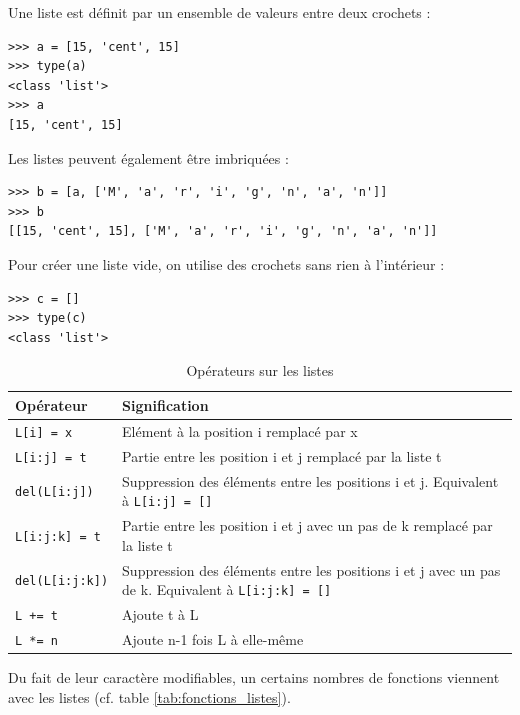 \documentclass[12pt, a4paper]{article}
\begin{document}
Une liste est définit par un ensemble de valeurs entre deux crochets :
\begin{lstlisting}
>>> a = [15, 'cent', 15]
>>> type(a)
<class 'list'>
>>> a
[15, 'cent', 15]
\end{lstlisting}

Les listes peuvent également être imbriquées :
\begin{lstlisting}
>>> b = [a, ['M', 'a', 'r', 'i', 'g', 'n', 'a', 'n']]
>>> b
[[15, 'cent', 15], ['M', 'a', 'r', 'i', 'g', 'n', 'a', 'n']]
\end{lstlisting}

Pour créer une liste vide, on utilise des crochets sans rien à l'intérieur :
\begin{lstlisting}
>>> c = []
>>> type(c)
<class 'list'>
\end{lstlisting}

\begin{table}[H]
	\begin{center}
		\begin{tabular}{|l|p{11cm}|}
			\hline
			\textbf{Opérateur} & \textbf{Signification} \\
			\hline
			\lstinline{L[i] = x} & Elément à la position i remplacé par x \\
			\lstinline{L[i:j] = t} & Partie entre les position i et j remplacé par la liste t \\
			\lstinline{del(L[i:j])} & Suppression des éléments entre les positions i et j. Equivalent à \lstinline{L[i:j] = []} \\
			\lstinline{L[i:j:k] = t} & Partie entre les position i et j avec un pas de k remplacé par la liste t \\
			\lstinline{del(L[i:j:k])} & Suppression des éléments entre les positions i et j avec un pas de k. Equivalent à \lstinline{L[i:j:k] = []} \\
			\lstinline{L += t} & Ajoute t à L \\
			\lstinline{L *= n}  & Ajoute n-1 fois L à elle-même \\
			\hline
		\end{tabular}
		\caption{Opérateurs sur les listes}
		\label{tab:operateurs_listes}
	\end{center}
\end{table}

Du fait de leur caractère modifiables, un certains nombres de fonctions viennent avec les listes (cf. table \ref{tab:fonctions_listes}).
\end{document}
